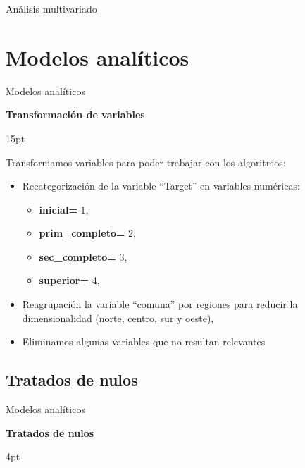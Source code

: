 \documentclass[pdf]{beamer}
\def\vspace{}%
\begin{document}
{\begin{frame}{Análisis multivariado}
\end{frame}

\section{Modelos analíticos}

\begin{frame}{Modelos analíticos}

    \begin{Large}
        \textbf{Transformación de variables}
    \end{Large}
    \vspace{15pt}

    Transformamos variables para poder trabajar con los algoritmos:
    \begin{itemize}
        \item Recategorización de la variable ``Target'' en variables numéricas:
        \begin{itemize}
            \item \textbf{inicial=} 1,
            \item \textbf{prim\_completo=} 2,
            \item \textbf{sec\_completo=} 3,
            \item \textbf{superior=} 4,
        \end{itemize}
        \item Reagrupación la variable ``comuna'' por regiones para reducir la dimensionalidad (norte, centro, sur y oeste),
        \item Eliminamos algunas variables que no resultan relevantes 
    \end{itemize}
    
\end{frame}

    \subsection{Tratados de nulos}
    
\begin{frame}{Modelos analíticos}
    \begin{Large}
        \textbf{Tratados de nulos}
    \end{Large}
    \vspace{4pt}


\end{frame}}
\end{document}
